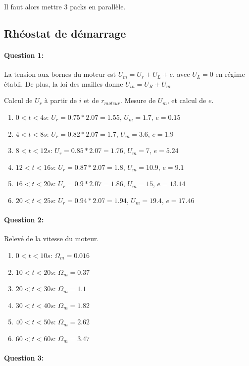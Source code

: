 Il faut alors mettre 3 packs en parallèle.

\subsection{Rhéostat de démarrage}

\paragraph{Question 1:}

La tension aux bornes du moteur est $U_m=U_r+U_L+e$, avec $U_L=0$ en régime établi. De plus, la loi des mailles donne $U_{in}=U_R+U_m$

Calcul de $U_r$ à partir de $i$ et de $r_{moteur}$. Mesure de $U_m$, et calcul de $e$.

\begin{enumerate}
 \item $0<t<4s$: $U_r=0.75*2.07=1.55$, $U_m=1.7$, $e=0.15$
 \item $4<t<8s$: $U_r=0.82*2.07=1.7$, $U_m=3.6$, $e=1.9$
 \item $8<t<12s$: $U_r=0.85*2.07=1.76$, $U_m=7$, $e=5.24$
 \item $12<t<16s$: $U_r=0.87*2.07=1.8$, $U_m=10.9$, $e=9.1$
 \item $16<t<20s$: $U_r=0.9*2.07=1.86$, $U_m=15$, $e=13.14$
 \item $20<t<25s$: $U_r=0.94*2.07=1.94$, $U_m=19.4$, $e=17.46$
\end{enumerate}

\paragraph{Question 2:}

Relevé de la vitesse du moteur.

\begin{enumerate}
 \item $0<t<10s$: $\Omega_m=0.016$
 \item $10<t<20s$: $\Omega_m=0.37$
 \item $20<t<30s$: $\Omega_m=1.1$
 \item $30<t<40s$: $\Omega_m=1.82$
 \item $40<t<50s$: $\Omega_m=2.62$
 \item $60<t<60s$: $\Omega_m=3.47$
\end{enumerate}

\paragraph{Question 3:}

